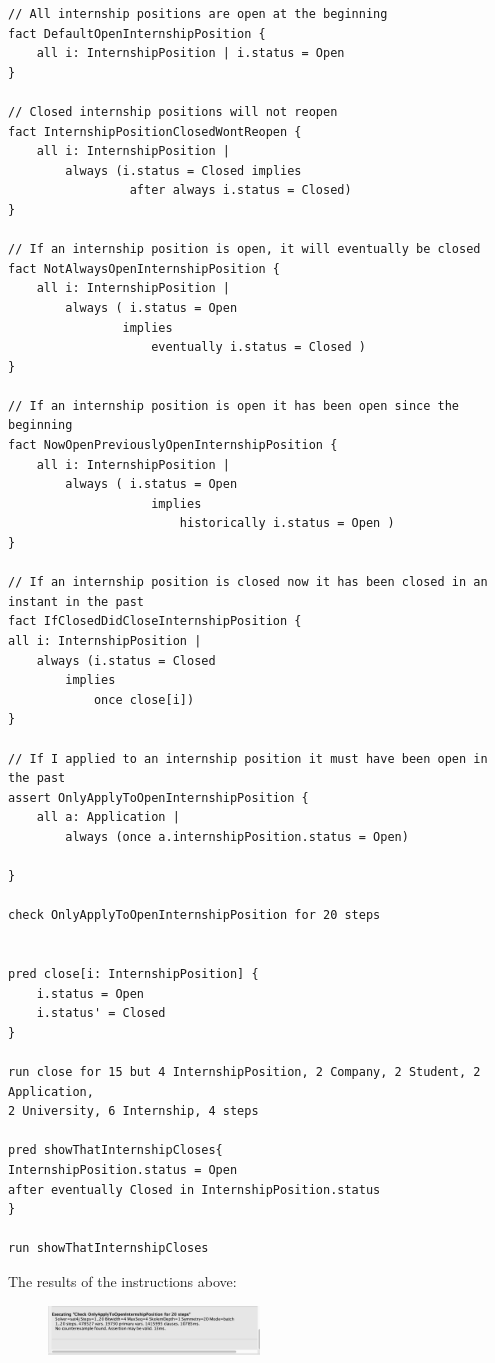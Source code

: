 \begin{verbatim}
// All internship positions are open at the beginning
fact DefaultOpenInternshipPosition {
    all i: InternshipPosition | i.status = Open
}

// Closed internship positions will not reopen
fact InternshipPositionClosedWontReopen {
	all i: InternshipPosition | 
		always (i.status = Closed implies
				 after always i.status = Closed)
}

// If an internship position is open, it will eventually be closed
fact NotAlwaysOpenInternshipPosition {
    all i: InternshipPosition | 
        always ( i.status = Open
                implies 
                    eventually i.status = Closed )
}

// If an internship position is open it has been open since the beginning
fact NowOpenPreviouslyOpenInternshipPosition {
    all i: InternshipPosition | 
        always ( i.status = Open
                    implies 
                        historically i.status = Open )
}

// If an internship position is closed now it has been closed in an instant in the past
fact IfClosedDidCloseInternshipPosition {
all i: InternshipPosition |
    always (i.status = Closed
        implies 
            once close[i])
}

// If I applied to an internship position it must have been open in the past
assert OnlyApplyToOpenInternshipPosition { 
    all a: Application | 
        always (once a.internshipPosition.status = Open)
        
}

check OnlyApplyToOpenInternshipPosition for 20 steps


pred close[i: InternshipPosition] {
    i.status = Open
    i.status' = Closed
}

run close for 15 but 4 InternshipPosition, 2 Company, 2 Student, 2 Application, 
2 University, 6 Internship, 4 steps

pred showThatInternshipCloses{
InternshipPosition.status = Open
after eventually Closed in InternshipPosition.status
}

run showThatInternshipCloses
\end{verbatim}
The results of the instructions above:
\begin{figure}[h!]
    \centering\includegraphics[width=0.5\textwidth]{RASD/Images/Alloy/checkOnlyApplyToOpenInternshipPosition.png}
    \label{fig:checkOnlyApplyToOpenInternshipPosition}
\end{figure}
